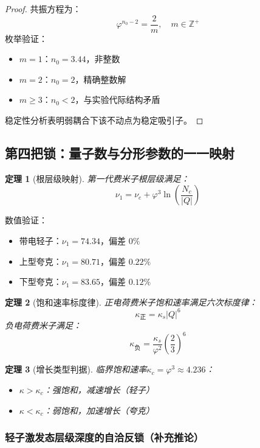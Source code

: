 \documentclass[12pt,a4paper,twocolumn]{article}
\renewcommand{\phi}{\varphi}
\newtheorem{theorem}{定理}[section]
\begin{document}
\begin{proof}
共振方程为：
\[
\phi^{n_0-2} = \frac{2}{m},\quad m\in\mathbb{Z}^+
\]
枚举验证：
\begin{itemize}
\item $m=1$：$n_0=3.44$，非整数
\item $m=2$：$n_0=2$，精确整数解
\item $m\ge3$：$n_0<2$，与实验代际结构矛盾
\end{itemize}
稳定性分析表明弱耦合下该不动点为稳定吸引子。
\end{proof}

\subsection{第四把锁：量子数与分形参数的一一映射}
\begin{theorem}[根层级映射]
第一代费米子根层级满足：
\[
\nu_1 = \nu_e + \phi^3 \ln\left(\frac{N_c}{|Q|}\right)
\]
\end{theorem}

数值验证：
\begin{itemize}
\item 带电轻子：$\nu_1 = 74.34$，偏差 $0\%$
\item 上型夸克：$\nu_1 = 80.71$，偏差 $0.22\%$
\item 下型夸克：$\nu_1 = 83.65$，偏差 $0.12\%$
\end{itemize}

\begin{theorem}[饱和速率标度律]
正电荷费米子饱和速率满足六次标度律：
\[
\kappa_{\text{正}} = \kappa_s |Q|^6
\]
负电荷费米子满足：
\[
\kappa_{\text{负}} = \frac{\kappa_s}{\phi^2}\left(\frac{2}{3}\right)^6
\]
\end{theorem}

\begin{theorem}[增长类型判据]
临界饱和速率$\kappa_c = \phi^3 \approx 4.236$：
\begin{itemize}
\item $\kappa > \kappa_c$：强饱和，减速增长（轻子）
\item $\kappa < \kappa_c$：弱饱和，加速增长（夸克）
\end{itemize}
\end{theorem}

\subsubsection{轻子激发态层级深度的自洽反锁（补充推论）}
\label{subsec:nu_generation}
\end{document}
